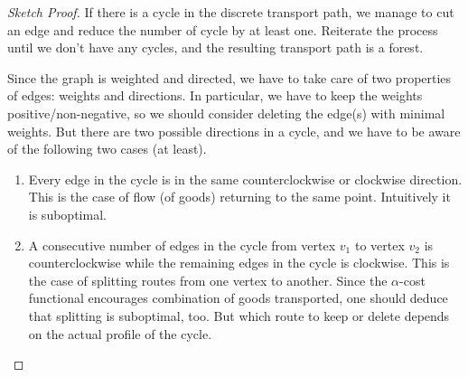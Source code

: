 \documentclass[fleqn]{article}
\theoremstyle{definition}
\theoremstyle{remark}
\begin{document}
\begin{proof}[Sketch Proof]\let\qed\relax
If there is a  cycle in the discrete transport path, we manage to cut an edge and reduce the number of cycle by at least one. Reiterate the process until we don't have any cycles, and the resulting transport path is a forest.
\par
Since the graph is weighted and directed, we have to take care of two properties of edges: weights and directions. In particular, we have to keep the weights positive/non-negative, so we should consider deleting the edge(s) with minimal weights. But there are two possible directions in a cycle, and we have to be aware of the following two cases (at least).
\begin{enumerate}
	\item Every edge in the cycle is in the same counterclockwise or clockwise direction. This is the case of flow (of goods) returning to the same point. Intuitively it is suboptimal.
    \item A consecutive number of edges in the cycle from vertex $v_1$ to vertex $v_2$ is counterclockwise while the remaining edges in the cycle is clockwise. This is the case of splitting routes from one vertex to another. Since the $\alpha$-cost functional encourages combination of goods transported, one should deduce that splitting is suboptimal, too. But which route to keep or delete depends on the actual profile of the cycle.
\end{enumerate}
\end{proof}
\end{document}
